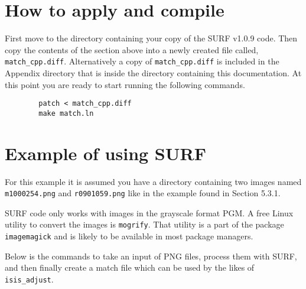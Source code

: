 \section{How to apply and compile}

First move to the directory containing your copy of the SURF v1.0.9
code. Then copy the contents of the section above into a newly created
file called, \verb=match_cpp.diff=. Alternatively a copy of
\verb=match_cpp.diff= is included in the Appendix directory that is
inside the directory containing this documentation. At this point you
are ready to start running the following commands.

\begin{verbatim}
        patch < match_cpp.diff
        make match.ln
\end{verbatim}

\begin{center}
\end{center}

\section{Example of using SURF}

For this example it is assumed you have a directory containing two
images named \verb=m1000254.png= and \verb=r0901059.png= like in the
example found in Section 5.3.1.

SURF code only works with images in the grayscale format PGM. A free
Linux utility to convert the images is \texttt{mogrify}. That utility
is a part of the package \texttt{imagemagick} and is likely to be
available in most package managers.

Below is the commands to take an input of PNG files, process them with
SURF, and then finally create a match file which can be used by the
likes of \texttt{isis\_adjust}.

